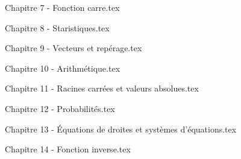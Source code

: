 \documentclass[11pt,a4paper,twoside,openany]{book}
\numberwithin{dummy}{section}
\theoremstyle{ocrenumboxTh}
\theoremstyle{ocrenumboxExercice}
\theoremstyle{ocrenumboxExercice}
\theoremstyle{ocrenumboxEx}
\theoremstyle{ocrenumboxEx}
\theoremstyle{ocrenumboxTh}
\theoremstyle{ocrenumboxTh*}
\theoremstyle{ocrenumboxTh}
\theoremstyle{ocrenumboxTh*}
\theoremstyle{ocrenumboxCoro}
\theoremstyle{ocrenumboxCoro*}
\theoremstyle{ocrenumboxCoro}
\theoremstyle{ocrenumboxCoro*}
\theoremstyle{ocrenumboxProp}
\theoremstyle{ocrenumboxProp*}
\theoremstyle{ocrenumboxProp}
\theoremstyle{ocrenumboxProp*}
\theoremstyle{ocrenumboxMéthode}
\theoremstyle{ocrenumboxMéthode}
\theoremstyle{ocrenumboxDef}
\theoremstyle{ocrenumboxDef*}
\theoremstyle{ocrenumboxDef}
\theoremstyle{ocrenumboxDef*}
\theoremstyle{ocrenumboxReg}
\theoremstyle{ocrenumboxReg*}
\theoremstyle{ocrenumboxReg}
\theoremstyle{ocrenumboxReg*}
\theoremstyle{ocrenumboxVoc}
\theoremstyle{ocrenumboxVoc}
\theoremstyle{ocrenumboxNot}
\theoremstyle{ocrenumboxNot}
\theoremstyle{ocrenumboxNot*}
\theoremstyle{ocrenumboxNot*}
\theoremstyle{ocrenum}
\begin{document}
\cleardoublepage
{Chapitre 7 - Fonction carre.tex}

\cleardoublepage
{Chapitre 8 - Staristiques.tex}

\cleardoublepage
{Chapitre 9 - Vecteurs et repérage.tex}

\cleardoublepage
{Chapitre 10 - Arithmétique.tex}

\cleardoublepage
{Chapitre 11 - Racines carrées et valeurs absolues.tex}

\cleardoublepage
{Chapitre 12 - Probabilités.tex}

\cleardoublepage
{Chapitre 13 - Équations de droites et systèmes d'équations.tex}

\cleardoublepage
{Chapitre 14 - Fonction inverse.tex}
\end{document}
